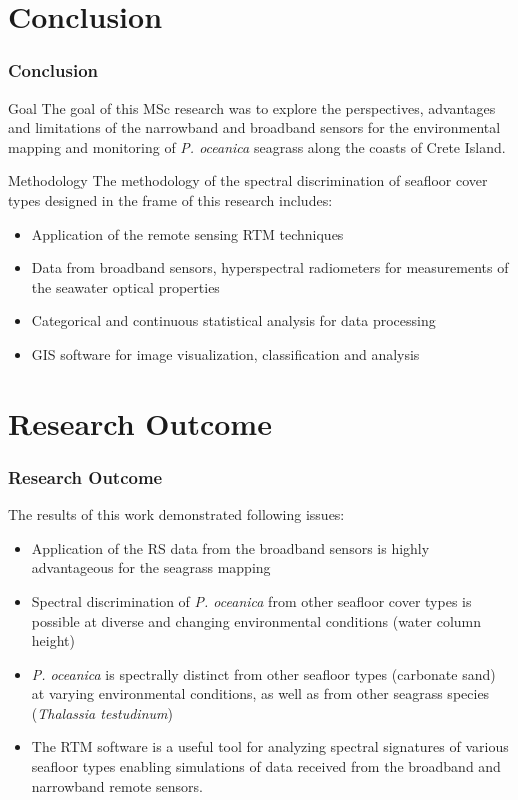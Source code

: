 \documentclass[pdflatex,compress,9pt,
	xcolor={dvipsnames,dvipsnames,svgnames,x11names,table},
	hyperref={colorlinks = true,breaklinks = true, urlcolor = NavyBlue, breaklinks = true}]{beamer}
\begin{document}
\section{Conclusion}
\begin{frame}\frametitle{Conclusion}

\begin{alertblock}{Goal}
The goal of this MSc research was to explore the perspectives, advantages and limitations of the narrowband and broadband sensors for the environmental mapping and monitoring of \emph{P. oceanica} seagrass along the coasts of Crete Island. 
\end{alertblock}

\begin{block}{Methodology}
The methodology of the spectral discrimination of seafloor cover types designed in the frame of this research includes:
\begin{itemize}
	\item Application of the remote sensing \ac{RTM} techniques
	\item Data from broadband sensors, hyperspectral radiometers for measurements of the seawater optical properties
	\item Categorical and continuous statistical analysis for data processing
	\item \ac{GIS} software for image visualization, classification and analysis
\end{itemize}
\end{block}
\end{frame}

\section{Research Outcome}
\begin{frame}\frametitle{Research Outcome}
The results of this work demonstrated following issues:
\begin{itemize}
	\item Application of the RS data from the broadband sensors is highly advantageous for the seagrass mapping
	\item Spectral discrimination of \emph{P. oceanica} from other seafloor cover types is possible at diverse and changing environmental conditions (water column height)
	\item \emph{P. oceanica} is spectrally distinct from other seafloor types (carbonate sand) at varying environmental conditions, as well as from other seagrass species (\emph{Thalassia testudinum})
	\item The \ac{RTM} software is a useful tool for analyzing spectral signatures of various seafloor types enabling simulations of data received from the broadband and narrowband remote sensors.
\end{itemize}
\end{frame}
\end{document}
